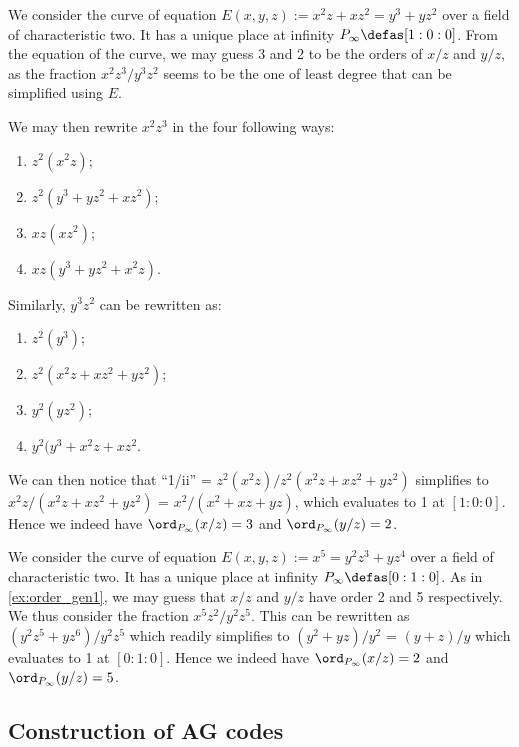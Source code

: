 \begin{example}[$x^2z + xz^2 = y^3+yz^2$]
\label{ex:order_gen1}
We consider the curve of equation $E(x,y,z) := x^2z + xz^2 = y^3+yz^2$ over a field of characteristic two. It has a unique place at infinity $P_\infty \defas [1:0:0]$.
From the equation of the curve, we may guess 3 and 2 to be the orders of $x/z$ and $y/z$, as the fraction $x^2z^3/y^3z^2$ seems to be the one of least degree
that can be simplified using $E$.

We may then rewrite $x^2z^3$ in the four following ways:
\begin{enumerate}
\item $z^2(x^2z)$;
\item $z^2(y^3 + yz^2 + xz^2)$;
\item $xz(xz^2)$;
\item $xz(y^3 + yz^2 + x^2z)$.
\end{enumerate}
Similarly, $y^3z^2$ can be rewritten as:
\renewcommand{\theenumi}{\roman{enumi}}
\begin{enumerate}
\item $z^2(y^3)$;
\item $z^2(x^2z + xz^2 + yz^2)$;
\item $y^2(yz^2)$;
\item $y^2(y^3 + x^2z + xz^2$.
\end{enumerate}
We can then notice that ``1/ii'' = $z^2(x^2z)/z^2(x^2z + xz^2 + yz^2)$ simplifies to $x^2z/(x^2z + xz^2 + yz^2)$ = $x^2/(x^2 + xz + yz)$,
which evaluates to 1 at $[1:0:0]$. Hence we indeed have $\ord_{P_\infty}(x/z) = 3$ and $\ord_{P_\infty}(y/z) = 2$.
\end{example}

\begin{example}[$x^5 = y^2z^3 + yz^4$]
\label{ex:order_gen2}
We consider the curve of equation $E(x,y,z) := x^5 = y^2z^3 + yz^4$ over a field of characteristic two. It has a unique place at infinity $P_\infty \defas [0:1:0]$.
As in \autoref{ex:order_gen1}, we may guess that $x/z$ and $y/z$ have order 2 and 5 respectively. We thus consider the fraction $x^5z^2/y^2z^5$.
This can be rewritten as $(y^2z^5 + yz^6)/y^2z^5$ which readily simplifies to $(y^2 +yz)/y^2$ = $(y+z)/y$ which evaluates to 1 at $[0:1:0]$.
Hence we indeed have $\ord_{P_\infty}(x/z) = 2$ and $\ord_{P_\infty}(y/z) = 5$.
\end{example}

\subsection{Construction of AG codes}
\label{sec:constr_ag}

